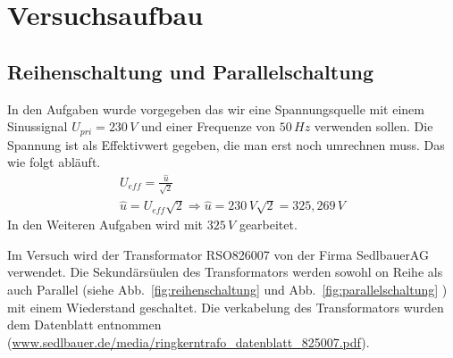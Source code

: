 \chapter{Versuchsaufbau}
    \section{Reihenschaltung und Parallelschaltung}
        In den Aufgaben wurde vorgegeben das wir eine Spannungsquelle mit einem Sinussignal $U_{pri}=230\,V$ und einer Frequenze von $50\,Hz$ verwenden sollen. 
        Die Spannung ist als Effektivwert gegeben, die man erst noch umrechnen muss. Das wie folgt abläuft. 
        \begin{gather}
            U_{eff}=\frac{\widehat{u}}{\sqrt{2}}\\
            \widehat{u} =U_{eff}\sqrt{2}\Rightarrow \widehat{u} =230\,V\sqrt{2}=325,269\,V
        \end{gather}
        In den Weiteren Aufgaben wird mit $325\,V$  gearbeitet.\par

        Im Versuch wird der Transformator RSO826007 von der Firma SedlbauerAG verwendet. Die Sekundärsüulen des Transformators werden sowohl on Reihe als auch Parallel (siehe Abb.~\ref{fig:reihenschaltung} und Abb.~\ref{fig:parallelschaltung} ) mit einem Wiederstand geschaltet. 
        Die verkabelung des Transformators wurden dem Datenblatt entnommen (\href{www.sedlbauer.de/media/ringkerntrafo_datenblatt_825007.pdf}{www.sedlbauer.de/media/ringkerntrafo\_datenblatt\_825007.pdf}).

